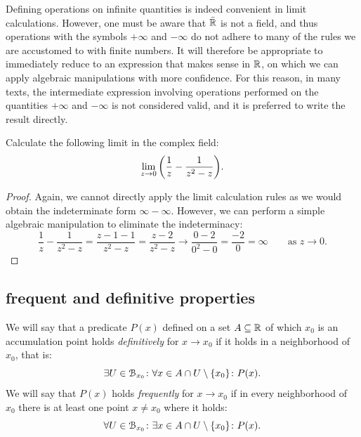 Defining operations on infinite quantities
is indeed convenient in limit calculations.
However, one must be aware that $\bar {{\mathbb R}}$ is not a field,
and thus operations with the symbols $+\infty$ and $-\infty$
do not adhere to many of the rules we are accustomed to
with finite numbers.
It will therefore be appropriate to immediately reduce to an expression
that makes sense in ${\mathbb R}$, on which we can
apply algebraic manipulations with more confidence.
For this reason, in many texts, the intermediate expression involving 
operations performed on the quantities $+\infty$ and $-\infty$ is not considered
valid,
and it is preferred to write the result directly.
  
\begin{example}
Calculate the following limit in the complex field:
\[
\lim_{z\to 0} {\left( \frac 1 {z} - \frac 1 {z^2-z} \right)}. 
\]
\end{example}
\begin{proof}
  Again, we cannot directly apply the limit calculation rules 
  as we would obtain the indeterminate form 
  $\infty - \infty$.
  However, we can perform a simple algebraic manipulation
  to eliminate the indeterminacy:
  \[
    \frac 1 {z} - \frac 1 {z^2-z}
    = \frac{z- 1 - 1}{z^2-z}
    = \frac{z-2}{z^2-z}
    \to \frac{0-2}{0^2-0} = \frac{-2}{0} = \infty 
    \qquad \text{as $z\to 0.$}
  \]
\end{proof}

\subsection{frequent and definitive properties}

\begin{definition}
We will say that a predicate $P(x)$ defined on a set $A\subseteq {\mathbb R}$ 
of which $x_0$ is an accumulation point holds 
\emph{definitively}%
%
 for $x\to x_0$ if
it holds in a neighborhood of $x_0$, that is:
\[
  \exists U\in \mathcal B_{x_0}\colon \forall x \in A\cap U\setminus{\left\{ x_0 \right\}}\colon P(x).
\]
We will say that $P(x)$ holds \emph{frequently}%
%
 for $x\to x_0$
if in every neighborhood of $x_0$ there is at least one point $x\neq x_0$ 
where it holds:
\[
  \forall U\in \mathcal B_{x_0}\colon \exists x\in A\cap U\setminus{\left\{ x_0 \right\}}
  \colon P(x).
\]
\end{definition}

